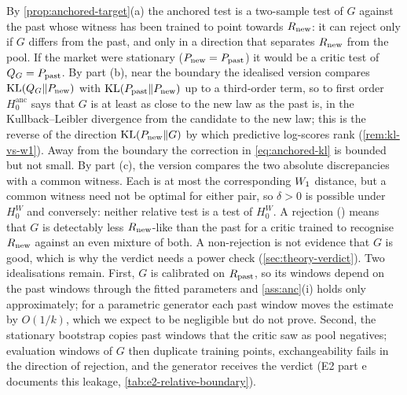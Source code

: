 \begin{remark}\label{rem:anchored-null}
By \cref{prop:anchored-target}(a) the anchored test is a two-sample test of $G$ against the past
whose witness has been trained to point towards $R_{\mathrm{new}}$: it can reject only if $G$ differs from the
past, and only in a direction that separates $R_{\mathrm{new}}$ from the pool. If the market were stationary
($P_{\mathrm{new}}=P_{\mathrm{past}}$) it would be a critic test of $Q_{G}=P_{\mathrm{past}}$. By part (b), near the boundary the
idealised \LRC{} version compares $\operatorname{KL}(Q_{G}\Vert P_{\mathrm{new}})$ with $\operatorname{KL}(P_{\mathrm{past}}\Vert P_{\mathrm{new}})$ up to a
third-order term, so to first order $H_0^{\mathrm{anc}}$ says that $G$ is at least as close to the
new law as the past is, in the Kullback--Leibler divergence from the candidate to the new law; this
is the reverse of the direction $\operatorname{KL}(P_{\mathrm{new}}\Vert G)$ by which predictive log-scores rank
(\cref{rem:kl-vs-w1}). Away from the boundary the correction in \eqref{eq:anchored-kl} is bounded
but not small. By part (c), the \WC{} version compares the two absolute discrepancies with a common
witness. Each is at most the corresponding $W_{1}$ distance, but a common witness need not be optimal
for either pair, so $\delta>0$ is possible under $H_0^W$ and conversely: neither relative test is a
test of $H_0^W$. A rejection (\BAD) means that $G$ is detectably less $R_{\mathrm{new}}$-like than the past
for a critic trained to recognise $R_{\mathrm{new}}$ against an even mixture of both. A non-rejection is not
evidence that $G$ is good, which is why the verdict needs a power check (\cref{sec:theory-verdict}).
Two idealisations remain. First, $G$ is calibrated on $R_{\mathrm{past}}$, so its windows depend on the past
windows through the fitted parameters and \cref{ass:anc}(i) holds only approximately; for a
parametric generator each past window moves the estimate by $O(1/k)$, which we expect to be
negligible but do not prove. Second, the stationary bootstrap copies past windows that the critic
saw as pool negatives; evaluation windows of $G$ then duplicate training points, exchangeability
fails in the direction of rejection, and the generator receives the verdict \INVALID{} (E2 part e
documents this leakage, \cref{tab:e2-relative-boundary}).
\end{remark}

